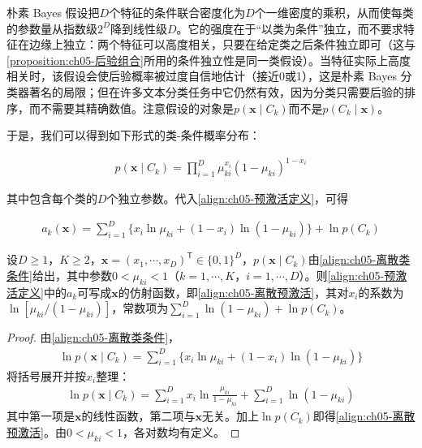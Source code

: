 \documentclass[../../main.tex]{subfiles}
\begin{document}
\begin{remark}
朴素 Bayes 假设把$D$个特征的条件联合密度化为$D$个一维密度的乘积，从而使每类的参数量从指数级$2^{D}$降到线性级$D$。它的强度在于“以类为条件”独立，而不要求特征在边缘上独立：两个特征可以高度相关，只要在给定类之后条件独立即可（这与\cref{proposition:ch05-后验组合}所用的条件独立性是同一类假设）。当特征实际上高度相关时，该假设会使后验概率被过度自信地估计（接近0或1），这是朴素 Bayes 分类器著名的局限；但在许多文本分类任务中它仍然有效，因为分类只需要后验的排序，而不需要其精确数值。注意假设的对象是$p(\boldsymbol{x}\mid C_k)$而不是$p(C_k\mid\boldsymbol{x})$。
\end{remark}

于是，我们可以得到如下形式的类-条件概率分布：

\begin{align}
  p(\boldsymbol{x}\mid C_k)=\prod_{i=1}^{D}\mu_{ki}^{x_i}(1-\mu_{ki})^{1-x_i}
  \label{align:ch05-离散类条件}
\end{align}

其中包含每个类的$D$个独立参数。代入\eqref{align:ch05-预激活定义}，可得

\begin{align}
  a_k(\boldsymbol{x})=\sum_{i=1}^{D}\bigl\{x_i\ln\mu_{ki}+(1-x_i)\ln(1-\mu_{ki})\bigr\}+\ln p(C_k)
  \label{align:ch05-离散预激活}
\end{align}

\begin{proposition}[离散特征的线性预激活]\label{proposition:ch05-离散线性预激活}
设$D\geqslant1$，$K\geqslant2$，$\boldsymbol{x}=(x_1,\cdots,x_D)^{\mathsf{T}}\in\{0,1\}^{D}$，$p(\boldsymbol{x}\mid C_k)$由\eqref{align:ch05-离散类条件}给出，其中参数$0<\mu_{ki}<1$（$k=1,\cdots,K$，$i=1,\cdots,D$）。则\eqref{align:ch05-预激活定义}中的$a_k$可写成$\boldsymbol{x}$的仿射函数，即\eqref{align:ch05-离散预激活}，其对$x_i$的系数为$\ln[\mu_{ki}/(1-\mu_{ki})]$，常数项为$\sum_{i=1}^{D}\ln(1-\mu_{ki})+\ln p(C_k)$。
\end{proposition}

\begin{proof}
由\eqref{align:ch05-离散类条件}，
\begin{align}
  \ln p(\boldsymbol{x}\mid C_k)=\sum_{i=1}^{D}\bigl\{x_i\ln\mu_{ki}+(1-x_i)\ln(1-\mu_{ki})\bigr\}
\end{align}
将括号展开并按$x_i$整理：
\begin{align}
  \ln p(\boldsymbol{x}\mid C_k)=\sum_{i=1}^{D}x_i\ln\frac{\mu_{ki}}{1-\mu_{ki}}+\sum_{i=1}^{D}\ln(1-\mu_{ki})
\end{align}
其中第一项是$\boldsymbol{x}$的线性函数，第二项与$\boldsymbol{x}$无关。加上$\ln p(C_k)$即得\eqref{align:ch05-离散预激活}。由$0<\mu_{ki}<1$，各对数均有定义。
\end{proof}
\end{document}
